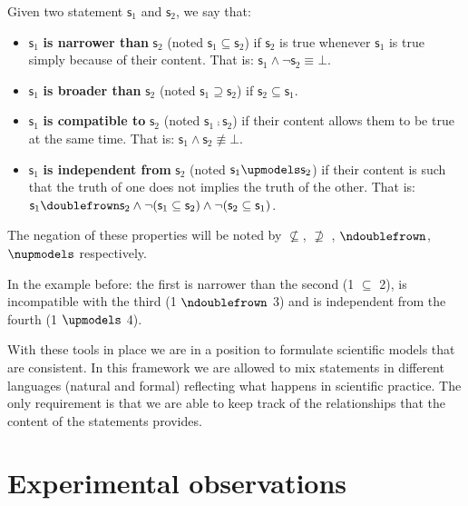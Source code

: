 \documentclass[11pt,letterpaper,fleqn]{memoir} %
\begin{document}
\begin{mathSection}

\begin{defn}
	Given two statement $\mathsf{s}_1$ and $\mathsf{s}_2$, we say that:
	\begin{itemize}
		\item $\mathsf{s}_1$ \textbf{is narrower than} $\mathsf{s}_2$ (noted $\mathsf{s}_1 \subseteq \mathsf{s}_2$) if $\mathsf{s}_2$ is true whenever $\mathsf{s}_1$ is true simply because of their content. That is: $\mathsf{s}_1 \wedge \neg \mathsf{s}_2 \equiv \bot$.
		\item $\mathsf{s}_1$ \textbf{is broader than} $\mathsf{s}_2$ (noted $\mathsf{s}_1 \supseteq \mathsf{s}_2$) if $\mathsf{s}_2 \subseteq \mathsf{s}_1$.
		\item $\mathsf{s}_1$ \textbf{is compatible to} $\mathsf{s}_2$ (noted $\mathsf{s}_1 \comp \mathsf{s}_2$) if their content allows them to be true at the same time. That is: $\mathsf{s}_1 \wedge \mathsf{s}_2 \nequiv \bot$.
		\item $\mathsf{s}_1$ \textbf{is independent from} $\mathsf{s}_2$ (noted $\mathsf{s}_1 \indep \mathsf{s}_2$) if their content is such that the truth of one does not implies the truth of the other. That is: $\mathsf{s}_1 \comp \mathsf{s}_2 \AND \NOT(\mathsf{s}_1 \subseteq \mathsf{s}_2) \AND \NOT(\mathsf{s}_2 \subseteq \mathsf{s}_1)$.
	\end{itemize}
	The negation of these properties will be noted by $\nsubseteq$, $\nsupseteq$ , $\ncomp$, $\nindep$ respectively.
\end{defn}

\end{mathSection}

In the example before: the first is narrower than the second (1 $\subseteq$ 2), is incompatible with the third (1 $\ncomp$ 3) and is independent from the fourth (1 $\indep$ 4).

With these tools in place we are in a position to formulate scientific models that are consistent. In this framework we are allowed to mix statements in different languages (natural and formal) reflecting what happens in scientific practice. The only requirement is that we are able to keep track of the relationships that the content of the statements provides.

\section{Experimental observations}
\end{document}
